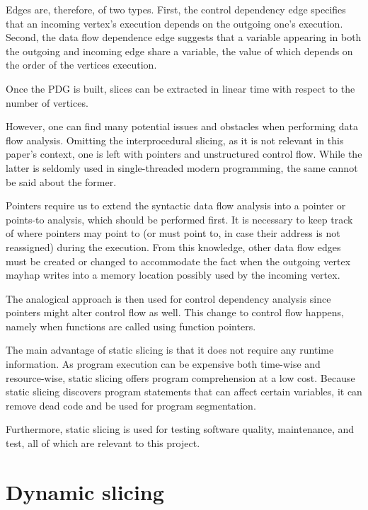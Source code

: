 Edges are, therefore, of two types. 
First, the control dependency edge specifies that an incoming vertex's 
execution depends on the outgoing one's execution. 
Second, the data flow dependence edge suggests that a variable appearing
in both the outgoing and incoming edge share a variable,
the value of which depends on the order of the vertices execution.

Once the PDG is built, slices can be extracted in linear time 
with respect to the number of vertices.


However, one can find many potential issues and obstacles when performing 
data flow analysis. 
Omitting the interprocedural slicing, as it is not relevant in this paper's
context, one is left with pointers and unstructured control flow.
While the latter is seldomly used in single-threaded modern programming, 
the same cannot be said about the former. 

Pointers require us to extend the syntactic data flow analysis 
into a pointer or points-to analysis, which should be performed first. 
It is necessary to keep track of where pointers may point to (or must point to,
in case their address is not reassigned) during the execution. 
From this knowledge, other data flow edges must be created or
changed to accommodate the fact when the outgoing vertex mayhap writes
into a memory location possibly used by the incoming vertex. 

The analogical approach is then used for control dependency analysis since 
pointers might alter control flow as well. 
This change to control flow happens, namely when functions are called using 
function pointers.

The main advantage of static slicing is that it does not require
any runtime information. 
As program execution can be expensive both time-wise and resource-wise, 
static slicing offers program comprehension at a low cost. 
Because static slicing discovers program statements that can affect 
certain variables, it can remove dead code and be used for program segmentation. 

Furthermore, static slicing is used for testing software quality, maintenance, 
and test, all of which are relevant to this project.

\section{Dynamic slicing}

